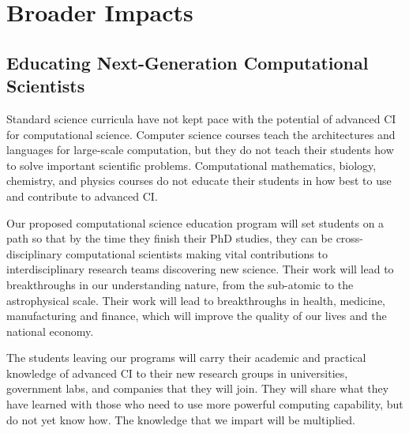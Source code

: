 \documentclass[11pt]{NSFamsart}
\begin{document}
\section{Broader Impacts}

\subsection{Educating Next-Generation Computational Scientists}
Standard science curricula have not kept pace with the potential of advanced CI for computational science.  Computer science courses teach the architectures and languages for large-scale computation, but they do not teach their students how to solve important scientific problems.  Computational mathematics, biology, chemistry, and physics courses do not educate their students in how best to use and contribute to advanced CI.

Our proposed computational science education program will set students on a path so that by the time they finish their PhD studies, they can be cross-disciplinary computational scientists making vital contributions to interdisciplinary research teams discovering new science.  Their work will lead to breakthroughs in our understanding nature, from the sub-atomic to the astrophysical scale.  Their work will lead to breakthroughs in health, medicine,  manufacturing and finance, which will improve the quality of our lives and the national economy. 

The students leaving our programs will carry their academic and practical knowledge of advanced CI to their new research groups in universities, government labs, and companies that they will join.  They will share what they have learned with those who need to use more powerful computing capability, but do not yet know how.  The knowledge that we impart will be multiplied.
\end{document}
